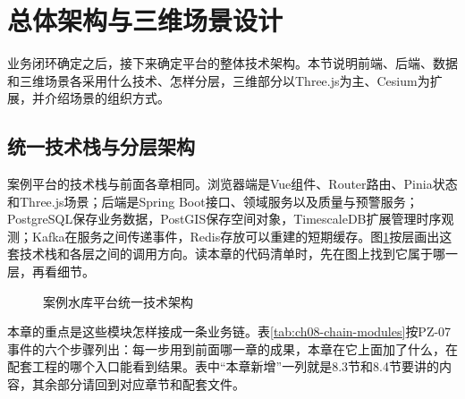 \section{总体架构与三维场景设计}

业务闭环确定之后，接下来确定平台的整体技术架构。本节说明前端、后端、数据和三维场景各采用什么技术、怎样分层，三维部分以Three.js为主、Cesium为扩展，并介绍场景的组织方式。

\subsection{统一技术栈与分层架构}

案例平台的技术栈与前面各章相同。浏览器端是Vue组件、Router路由、Pinia状态和Three.js场景；后端是Spring Boot接口、领域服务以及质量与预警服务；PostgreSQL保存业务数据，PostGIS保存空间对象，TimescaleDB扩展管理时序观测；Kafka在服务之间传递事件，Redis存放可以重建的短期缓存。图\ref{fig:case-layered-architecture}按层画出这套技术栈和各层之间的调用方向。读本章的代码清单时，先在图上找到它属于哪一层，再看细节。

\begin{figure}[htbp]
\centering
{}
\caption{案例水库平台统一技术架构}
\label{fig:case-layered-architecture}
\end{figure}

本章的重点是这些模块怎样接成一条业务链。表\ref{tab:ch08-chain-modules}按PZ-07事件的六个步骤列出：每一步用到前面哪一章的成果，本章在它上面加了什么，在配套工程的哪个入口能看到结果。表中“本章新增”一列就是8.3节和8.4节要讲的内容，其余部分请回到对应章节和配套文件。

